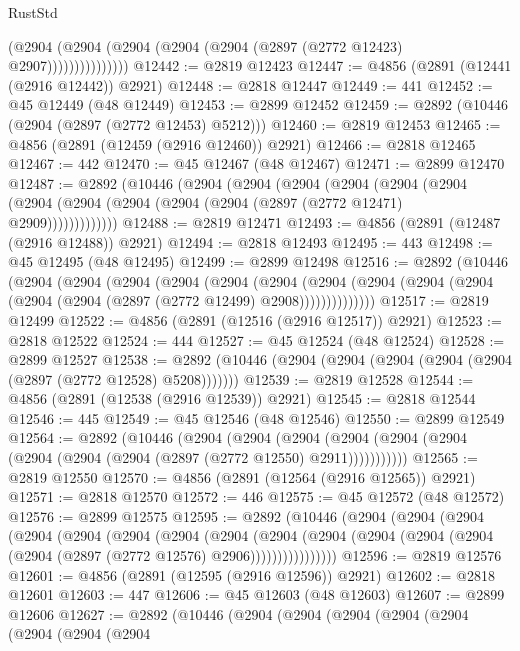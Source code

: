 \begin{lexlean}{RustStd}
\begin{coremodule}
                      (@2904 (@2904 (@2904 (@2904 (@2904 (@2897 (@2772 @12423) @2907)))))))))))))))
@12442 := @2819 @12423
@12447 := @4856 (@2891 (@12441 (@2916 @12442)) @2921)
@12448 := @2818 @12447
@12449 := 441
@12452 := @45 @12449 (@48 @12449)
@12453 := @2899 @12452
@12459 := @2892 (@10446 (@2904 (@2897 (@2772 @12453) @5212)))
@12460 := @2819 @12453
@12465 := @4856 (@2891 (@12459 (@2916 @12460)) @2921)
@12466 := @2818 @12465
@12467 := 442
@12470 := @45 @12467 (@48 @12467)
@12471 := @2899 @12470
@12487 := @2892
    (@10446
      (@2904
        (@2904
          (@2904
            (@2904
              (@2904
                (@2904 (@2904 (@2904 (@2904 (@2904 (@2904 (@2897 (@2772 @12471) @2909)))))))))))))
@12488 := @2819 @12471
@12493 := @4856 (@2891 (@12487 (@2916 @12488)) @2921)
@12494 := @2818 @12493
@12495 := 443
@12498 := @45 @12495 (@48 @12495)
@12499 := @2899 @12498
@12516 := @2892
    (@10446
      (@2904
        (@2904
          (@2904
            (@2904
              (@2904
                (@2904
                  (@2904
                    (@2904 (@2904 (@2904 (@2904 (@2904 (@2897 (@2772 @12499) @2908))))))))))))))
@12517 := @2819 @12499
@12522 := @4856 (@2891 (@12516 (@2916 @12517)) @2921)
@12523 := @2818 @12522
@12524 := 444
@12527 := @45 @12524 (@48 @12524)
@12528 := @2899 @12527
@12538 := @2892 (@10446 (@2904 (@2904 (@2904 (@2904 (@2904 (@2897 (@2772 @12528) @5208)))))))
@12539 := @2819 @12528
@12544 := @4856 (@2891 (@12538 (@2916 @12539)) @2921)
@12545 := @2818 @12544
@12546 := 445
@12549 := @45 @12546 (@48 @12546)
@12550 := @2899 @12549
@12564 := @2892
    (@10446
      (@2904
        (@2904
          (@2904 (@2904 (@2904 (@2904 (@2904 (@2904 (@2904 (@2897 (@2772 @12550) @2911)))))))))))
@12565 := @2819 @12550
@12570 := @4856 (@2891 (@12564 (@2916 @12565)) @2921)
@12571 := @2818 @12570
@12572 := 446
@12575 := @45 @12572 (@48 @12572)
@12576 := @2899 @12575
@12595 := @2892
    (@10446
      (@2904
        (@2904
          (@2904
            (@2904
              (@2904
                (@2904
                  (@2904
                    (@2904
                      (@2904
                        (@2904
                          (@2904 (@2904 (@2904 (@2904 (@2897 (@2772 @12576) @2906))))))))))))))))
@12596 := @2819 @12576
@12601 := @4856 (@2891 (@12595 (@2916 @12596)) @2921)
@12602 := @2818 @12601
@12603 := 447
@12606 := @45 @12603 (@48 @12603)
@12607 := @2899 @12606
@12627 := @2892
    (@10446
      (@2904
        (@2904
          (@2904
            (@2904
              (@2904
                (@2904
                  (@2904
                    (@2904

\end{coremodule}
\end{lexlean}

